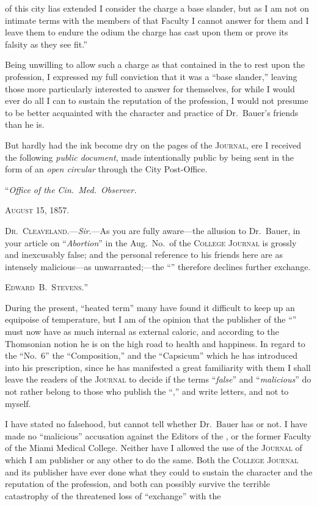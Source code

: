 of this city lias extended I consider the charge a base slander, but as I
am not on intimate terms with the members of that Faculty I cannot
answer for them and I leave them to endure the odium the charge has
cast upon them or prove its falsity as they see fit.''

Being unwilling to allow such a charge as that contained in the
 to rest upon the profession, I expressed my full conviction
that it was a ``base slander,'' leaving those more particularly interested
to answer for themselves, for while I would ever do all I can to sustain
the reputation of the profession, I would not presume to be better
acquainted with the character and practice of Dr.~Bauer's friends
than he is.

But hardly had the ink become dry on the pages of the \textsc{Journal}, ere
I received the following \emph{public document}, made intentionally public by
being sent in the form of an \emph{open circular} through the City Post-Office.

\hfill{}``\emph{Office of the Cin.\ Med.\ Observer.}\quad

\hfill{}\textsc{August 15, 1857.}\quad

\textsc{Dr.~Cleaveland}.---\emph{Sir}.---As you are fully aware---the allusion to
Dr.~Bauer, in your article on ``\emph{Abortion}'' in the Aug.\ No.\ of the
\textsc{College Journal} is grossly and inexcusably false; and the personal
reference to his friends here are as intensely malicious---as unwarranted;---the
``'' therefore declines further exchange.

\hfill{}\textsc{Edward~B.~Stevens.}''\quad

During the present, ``heated term'' many have found it difficult to
keep up an equipoise of temperature, but I am of the opinion that the
publisher of the ``'' must now have as much internal as
external caloric, and according to the Thomsonian notion he is on
the high road to health and happiness. In regard to the ``No.~6'' the
``Composition,'' and the ``Capsicum'' which he has introduced into
his prescription, since he has manifested a great familiarity with them
I shall leave the readers of the \textsc{Journal} to decide if the terms ``\emph{false}''
and ``\emph{malicious}'' do not rather belong to those who publish the ``,''
and write letters, and not to myself.

I have stated no falsehood, but cannot tell whether Dr.~Bauer has
or not. I have made no ``malicious'' accusation against the Editors of
the , or the former Faculty of the Miami Medical College.
Neither have I allowed the use of the \textsc{Journal} of which I am publisher
or any other to do the same. Both the \textsc{College Journal} and
its publisher have ever done what they could to sustain the character
and the reputation of the profession, and both can possibly survive
the terrible catastrophy of the threatened loss of ``exchange'' with the\endinput
